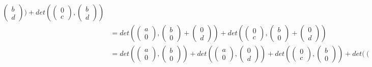 \begin{example}
\begin{align*}
\begin{pmatrix}
        b \\ d
    \end{pmatrix})+det(\begin{pmatrix}
        0 \\ c
    \end{pmatrix}, \begin{pmatrix}
        b \\ d
    \end{pmatrix})\tag{by Multilinearity}\\
    &=det(\begin{pmatrix}
        a \\ 0
    \end{pmatrix}, \begin{pmatrix}
        b \\ 0
    \end{pmatrix}+\begin{pmatrix}
        0 \\ d
    \end{pmatrix})+det(\begin{pmatrix}
        0 \\ c
    \end{pmatrix}, \begin{pmatrix}
        b \\ 0
    \end{pmatrix}+\begin{pmatrix}
        0 \\ d
    \end{pmatrix})\\
    &=det(\begin{pmatrix}
        a \\ 0
    \end{pmatrix}, \begin{pmatrix}
        b \\ 0
    \end{pmatrix})+det(\begin{pmatrix}
        a \\ 0
    \end{pmatrix}, \begin{pmatrix}
        0 \\ d
    \end{pmatrix})+det(\begin{pmatrix}
        0 \\ c
    \end{pmatrix}, \begin{pmatrix}
        b \\ 0
    \end{pmatrix})+det(\begin{pmatrix}

\end{pmatrix}
\end{align*}
\end{example}
